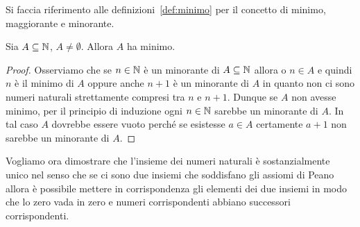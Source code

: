 Si faccia riferimento alle definizioni~\ref{def:minimo}
per il concetto di minimo, maggiorante e minorante.
%
\begin{theorem}
  \label{th:buon_ordinamento}
  Sia $A\subseteq {\mathbb N}$, $A\neq \emptyset$. 
  Allora $A$ ha minimo.
\end{theorem}
%
\begin{proof}
  Osserviamo che se $n\in {\mathbb N}$ è un minorante di $A\subseteq {\mathbb N}$ 
  allora o $n\in A$ e quindi $n$ è il minimo di $A$
  oppure anche $n+1$ è un minorante di $A$ in quanto 
  non ci sono numeri naturali strettamente compresi tra $n$ e $n+1$.
  Dunque se $A$ non avesse minimo, per il principio di induzione 
  ogni $n\in{\mathbb N}$ sarebbe un minorante di $A$.
  In tal caso $A$ dovrebbe essere vuoto perché se esistesse $a\in A$ 
  certamente $a+1$ non sarebbe un minorante di $A$.
\end{proof}

Vogliamo ora dimostrare che l'insieme dei numeri naturali è sostanzialmente 
unico nel senso che se ci sono due insiemi che soddisfano gli assiomi di 
Peano allora è possibile mettere in corrispondenza gli elementi dei due insiemi 
in modo che lo zero vada in zero e numeri corrispondenti abbiano successori 
corrispondenti.

